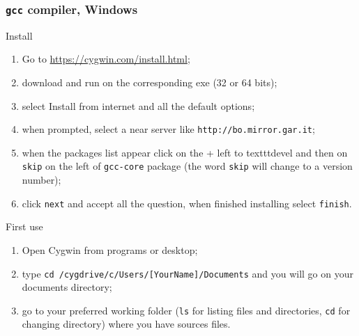 \begin{frame}
  \frametitle{\texttt{gcc} compiler, Windows}
  \begin{block}{Install}
    \begin{enumerate}
    \item Go to \url{https://cygwin.com/install.html};
    \item download and run on the corresponding \alert{exe} (32 or 64 bits);
    \item select \alert{Install from internet} and all the default options;
    \item when prompted, select a near server like \alert{\texttt{http://bo.mirror.gar.it}};
    \item when the packages list appear click on the + left to \alert{texttt{devel}} and then on \alert{\texttt{skip}} on the left of \alert{\texttt{gcc-core}} package (the word \texttt{skip} will change to a version number);
    \item click \alert{\texttt{next}} and accept all the question, when finished installing select \alert{\texttt{finish}}.
    \end{enumerate}
  \end{block}
  \begin{block}{First use}
    \begin{enumerate}
    \item Open Cygwin from programs or desktop;
    \item type \alert{\texttt{cd /cygdrive/c/Users/[YourName]/Documents}} and you will go on your documents directory;
    \item go to your preferred working folder (\alert{\texttt{ls}} for listing files and directories, \alert{\texttt{cd}} for changing directory) where you have sources files.
    \end{enumerate}
  \end{block}
\end{frame}

